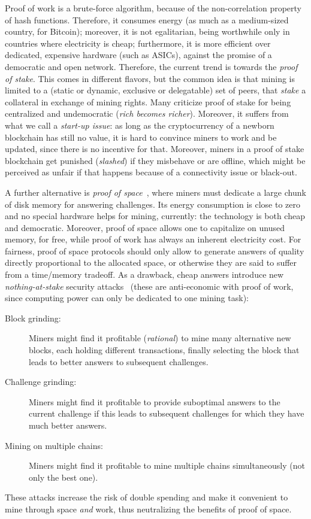 Proof of work is a brute-force algorithm,
because of the non-correlation property of hash functions.
Therefore, it consumes energy (as much as a medium-sized country, for Bitcoin);
moreover, it is not egalitarian, being
worthwhile only in countries where electricity is cheap; furthermore, it
is more efficient over dedicated, expensive hardware (such as ASICs),
against the promise of a democratic and open network.
Therefore, the current trend is towards the \emph{proof of stake}.
This comes in different flavors, but
the common idea is that mining is limited to a (static or dynamic, exclusive or delegatable)
set of peers, that \emph{stake} a collateral in exchange of mining rights.
Many criticize proof of stake for being centralized and undemocratic
(\emph{rich becomes richer}).
Moreover, it suffers from what we call a \emph{start-up issue}: as long as the cryptocurrency
of a newborn blockchain has still no value, it is hard to convince miners to work and
be updated, since there is no incentive for that. Moreover, miners in
a proof of stake blockchain get punished (\emph{slashed}) if they misbehave or are offline, which
might be perceived as unfair if that happens because of a connectivity issue or black-out.

A further alternative is \emph{proof of space}~\cite{AtenieseBFG14,DziembowskiFKP15}, where
miners must dedicate a large chunk of disk memory for answering challenges.
Its energy consumption is close to zero and no special
hardware helps for mining, currently: the technology is both cheap
and democratic. Moreover, proof of space allows
one to capitalize on unused memory, for free, while proof of work has always an
inherent electricity cost.
For fairness, proof of space protocols should only allow to generate answers of
quality directly proportional to the allocated space, or otherwise they are said
to suffer from a time/memory tradeoff. As a drawback,
cheap answers introduce new \emph{nothing-at-stake} security attacks~\cite{ParkKFGAP18}
(these are anti-economic with proof of work,
since computing power can only be dedicated to one mining task):
%
\begin{description}
\item[Block grinding:] Miners might find it profitable (\emph{rational})
  to mine many alternative new blocks, each holding
  different transactions, finally selecting the block that leads to better answers
  to subsequent challenges.
\item[Challenge grinding:] Miners might find it profitable
  to provide suboptimal answers to the current challenge if
  this leads to subsequent challenges for which they have much better answers.
\item[Mining on multiple chains:] Miners might find it profitable
  to mine multiple chains simultaneously (not only the best one).
\end{description}
%
These attacks increase the risk of double spending and make it convenient
to mine through space \emph{and} work, thus neutralizing the benefits of proof of space.

